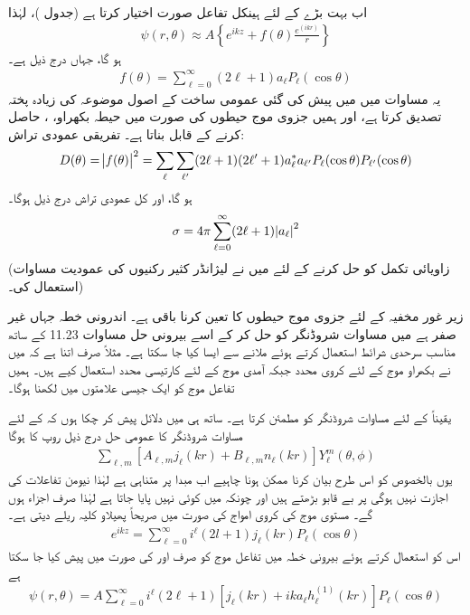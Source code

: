 اب بہت بڑے  کے لئے  ہینکل تفاعل  صورت اختیار کرتا ہے (جدول  )،  لہٰذا
\begin{align}
	\psi(r, \theta)\approx A\left\{e^{ikz}+f(\theta)\frac{e^{(ikr)}}{r}\right\}
\end{align}
ہو گا، جہاں  درج ذیل ہے۔
\begin{align}
	f(\theta) = \sum_{\ell=0}^{\infty}(2\ell +1)a_{\ell}P_{\ell}(\cos\theta)
\end{align}
یہ مساوات   میں میں پیش کی گئی عمومی ساخت کے اصول موضوعہ کی زیادہ پختہ  تصدیق کرتا ہے،  اور ہمیں  جزوی موج حیطوں  کی صورت میں حیطہ بکھراو، ،  حاصل  کرنے کے قابل بناتا ہے۔ تفریقی عمودی تراش:
\begin{align}
	D(\theta) = \abs{f(\theta)}^2 = \sum_{\ell}\sum_{\ell'}(2\ell+1)(2\ell'+1)a^*_{\ell}a_{\ell'}P_{\ell}(\cos\theta)P_{\ell'}(\cos\theta)
\end{align}
ہو گا، اور کل عمودی تراش درج ذیل ہوگا۔
\begin{align}
	\sigma=4\pi\sum_{\ell=0}^{\infty}(2\ell+1)\abs{a_{\ell}}^2
\end{align}
(زاویائی تکمل کو حل کرنے کے لئے میں نے لیژانڈر کثیر رکنیوں کی عمودیت مساوات   استعمال کی۔)


زیر غور مخفیہ کے لئے جزوی موج حیطوں  کا تعین کرنا باقی ہے۔ اندرونی خطہ جہاں  غیر صفر ہے میں مساوات شروڈنگر کو حل کر کے اسے بیرونی حل مساوات \num{11.23} کے ساتھ مناسب سرحدی شرائط استعمال کرتے ہوئے ملانے سے ایسا کیا جا سکتا ہے۔ مثلاً صرف اتنا ہے کہ میں نے بکھراو موج کے لئے کروی محدد جبکہ آمدی موج کے لئے کارتیسی محدد استعمال کیے  ہیں۔ ہمیں تفاعل موج کو ایک جیسی علامتوں میں لکھنا ہوگا۔

یقیناً  کے لئے مساوات شروڈنگر کو  مطمئن کرتا ہے۔ ساتھ ہی میں دلائل پیش کر چکا ہوں کہ  کے لئے مساوات شروڈنگر کا عمومی حل درج ذیل روپ کا ہوگا
\begin{align*}
	\sum_{\ell, m}\left[A_{\ell, m}j_{\ell}(kr)+B_{\ell, m}n_{\ell}(kr)\right]Y_{\ell}^m(\theta, \phi)
\end{align*}
یوں بالخصوص  کو اس طرح بیان کرنا ممکن ہونا چاہیے اب مبدا پر  متناہی ہے لہٰذا نیومن تفاعلات کی اجازت نہیں ہوگی  پر  بے قابو بڑھتے ہیں اور چونکہ  میں کوئی  نہیں پایا جاتا ہے لہٰذا صرف  اجزاء ہوں گے۔ مستوی موج کی کروی امواج کی صورت میں صریحاً پھیلاو کلیہ ریلے دیتی ہے۔
\begin{align}
	e^{ikz} = \sum_{\ell=0}^{\infty}i^{\ell}(2l+1)j_{\ell}(kr)P_{\ell}(\cos\theta)
\end{align}
اس کو استعمال کرتے ہوئے بیرونی خطہ میں تفاعل موج کو صرف  اور  کی صورت میں پیش کیا جا سکتا ہے
\begin{align}
	\psi(r, \theta) = A\sum_{\ell=0}^{\infty}i^{\ell}(2\ell+1)\left[j_{\ell}(kr)+ika_{\ell}h_{\ell}^{(1)}(kr)\right]P_{\ell}(\cos\theta)
\end{align}

